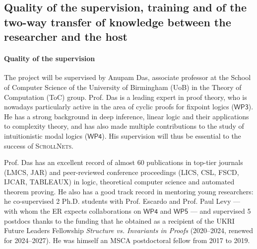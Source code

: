 \documentclass[12pt,draftproposal]{msca-pf}
\newcommand{\proj}{\small\textsc{ScrollNets}}
\newcommand{\WP}[1]{$\mathsf{WP#1}$}
\begin{document}



\subsection{Quality of the supervision, training and of the two-way transfer of
    knowledge between the researcher and the host}
\label{ssc:excellence:supervision}

\paragraph{Quality of the supervision}
The project will be supervised by Anupam Das, associate professor at the School of Computer Science
of the University of Birmingham (UoB) in the Theory of Computation (ToC) group. Prof. Das is a leading
expert in proof theory, who is nowadays particularly active in the area of cyclic proofs for
fixpoint logics (\WP{3}). He has a strong background in deep inference, linear logic and their
applications to complexity theory, and has also made multiple contributions to the study of
intuitionistic modal logics (\WP{4}). His supervision will thus be essential to the success of
{\proj}.

Prof. Das has an excellent record of almost 60 publications in top-tier journals (LMCS, JAR) and
peer-reviewed conference proceedings (LICS, CSL, FSCD, IJCAR, TABLEAUX) in logic, theoretical
computer science and automated theorem proving. He also has a good track record in mentoring young
researchers: he co-supervised 2 Ph.D. students with Prof. Escardo and Prof. Paul Levy --- with whom
the ER expects collaborations on \WP{4} and \WP{5} --- and supervised 5 postdocs thanks to the
funding that he obtained as a recipient of the UKRI Future Leaders Fellowship \textit{Structure vs.
Invariants in Proofs} (2020--2024, renewed for 2024--2027). He was himself an MSCA postdoctoral
fellow from 2017 to 2019.
\end{document}
